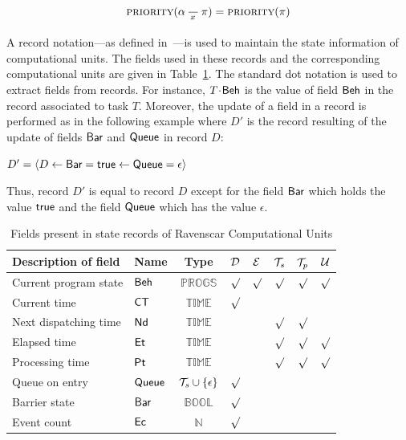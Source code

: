 \begin{equation}
\label{eq:pcp_rule}
  \text{{\scshape priority}}(\alpha\,\frac{}{\,^{{x}}\,}\,\pi) = 
  \text{{\scshape priority}}(\pi)
\end{equation}

A record notation---as defined in~\cite{cardelli@mfps90}---is used to
maintain the state information of computational units. The fields used
in these records and the corresponding computational units are given
in Table~\ref{tab:fields}. The standard dot notation is used to
extract fields from records. For instance, $T\!\cdot\!\text{\sffamily
  Beh}$ is the value of field $\text{\sffamily Beh}$ in the record
associated to task $T$. Moreover, the update of a field in a record is
performed as in the following example where $D'$ is the record
resulting of the update of fields $\text{\sffamily Bar}$ and $\text{\sffamily Queue}$ in
record $D$:

\begin{center}
$D'=
  \langle
    D\gets\text{\sffamily Bar}=\text{\sffamily true}\gets\text{\sffamily Queue}=\epsilon
  \rangle$
\end{center}

Thus, record $D'$ is equal to record $D$ except for the field
$\text{\sffamily Bar}$ which holds the value $\text{\sffamily true}$ and the field
$\text{\sffamily Queue}$ which has the value $\epsilon$.


\begin{table}
\centering
\begin{tabular}{|l|l|c|c|c|c|c|c|}
\hline
Description of field & Name & Type 
& ${\cal D}$ & ${\cal E}$ & ${\cal T}_s$ & ${\cal T}_p$ & ${\cal U}$ \\ 
\hline
Current program state & 
$\text{\sffamily Beh}$ & ${\scriptstyle \mathbb{PROGS}}$
& $\surd$ & $\surd$ & $\surd$ & $\surd$ & $\surd$ \\
\hline
Current time & 
$\text{\sffamily CT}$ & ${\scriptstyle \mathbb{TIME}}$
& $\surd$ &  &  &  &  \\
\hline
Next dispatching time &
$\text{\sffamily Nd}$ & ${\scriptstyle \mathbb{TIME}}$
&  &  & $\surd$ & $\surd$ &  \\
\hline
Elapsed time & 
$\text{\sffamily Et}$ & ${\scriptstyle \mathbb{TIME}}$
&  &  & $\surd$ & $\surd$ & $\surd$ \\
\hline
Processing time & 
$\text{\sffamily Pt}$ & ${\scriptstyle \mathbb{TIME}}$
&  &  & $\surd$ & $\surd$ & $\surd$ \\
\hline
Queue on entry & 
$\text{\sffamily Queue}$ & ${\cal T}_s \cup \{\epsilon\}$
& $\surd$ &  &  &  &  \\
\hline
Barrier state & 
$\text{\sffamily Bar}$ & ${\scriptstyle \mathbb{BOOL}}$
& $\surd$ &  &  &  &  \\
\hline
Event count & 
$\text{\sffamily Ec}$ & $\mathbb{N}$
& $\surd$ &  &  &  &  \\
\hline
\end{tabular}
\caption{Fields present in state records of Ravenscar Computational Units}
\label{tab:fields}
\end{table}

